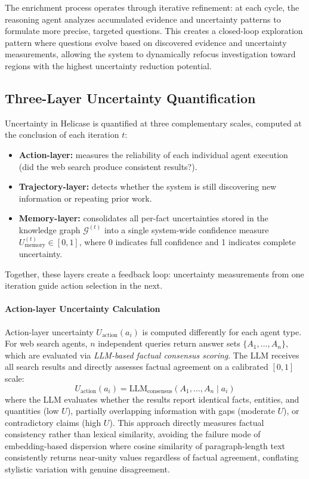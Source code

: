 \documentclass{article}
\begin{document}
The enrichment process operates through iterative refinement: at each cycle, the reasoning agent analyzes accumulated evidence and uncertainty patterns to formulate more precise, targeted questions. This creates a closed-loop exploration pattern where questions evolve based on discovered evidence and uncertainty measurements, allowing the system to dynamically refocus investigation toward regions with the highest uncertainty reduction potential.

\subsection{Three-Layer Uncertainty Quantification}
\label{subsec:uncertainty-quantification}

Uncertainty in Helicase is quantified at three complementary scales, computed at the conclusion of each iteration $t$:
\begin{itemize}
\item \textbf{Action-layer:} measures the reliability of each individual agent execution (did the web search produce consistent results?).
\item \textbf{Trajectory-layer:} detects whether the system is still discovering new information or repeating prior work.
\item \textbf{Memory-layer:} consolidates all per-fact uncertainties stored in the knowledge graph $\mathcal{G}^{(t)}$ into a single system-wide confidence measure $U_{\text{memory}}^{(t)} \in [0,1]$, where 0 indicates full confidence and 1 indicates complete uncertainty.
\end{itemize}
Together, these layers create a feedback loop: uncertainty measurements from one iteration guide action selection in the next.

\paragraph{Action-layer Uncertainty Calculation}
Action-layer uncertainty $U_{\text{action}}(a_i)$ is computed differently for each agent type. For web search agents, $n$ independent queries return answer sets $\{A_1, \dots, A_n\}$, which are evaluated via \textit{LLM-based factual consensus scoring}. The LLM receives all search results and directly assesses factual agreement on a calibrated $[0, 1]$ scale:
\begin{equation}
U_{\text{action}}(a_i) = \text{LLM}_{\text{consensus}}(A_1, \dots, A_n \mid a_i)
\end{equation}
where the LLM evaluates whether the results report identical facts, entities, and quantities (low $U$), partially overlapping information with gaps (moderate $U$), or contradictory claims (high $U$). This approach directly measures factual consistency rather than lexical similarity, avoiding the failure mode of embedding-based dispersion where cosine similarity of paragraph-length text consistently returns near-unity values regardless of factual agreement, conflating stylistic variation with genuine disagreement.
\end{document}
